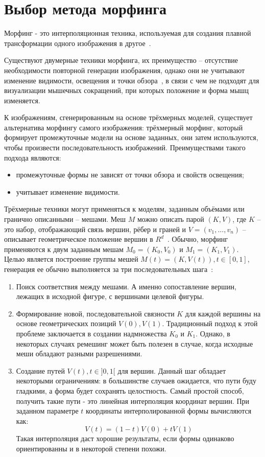 \section{Выбор метода морфинга}
\label{sec:morph}
Морфинг - это интерполяционная техника, используемая для создания плавной трансформации одного изображения в другое~\cite{volume_morph}.
\par Существуют двумерные техники морфинга, их преимущество -- отсутствие необходимости повторной генерации изображения, однако они не учитывают изменение видимости, освещения и точки обзора~\cite{volume_morph}, в связи с чем не подходят для визуализации мышечных сокращений, при которых положение и форма мышц изменяется.
\par К изображениям, сгенерированным на основе трёхмерных моделей, существует альтернатива морфингу самого изображения: трёхмерный морфинг, который формирует промежуточные модели на основе заданных, они затем используются, чтобы произвести последовательность изображений. Преимуществами такого подхода являются:
\begin{itemize}
	\item промежуточные формы не зависят от точки обзора и свойств освещения;
	\item учитывает изменение видимости.
\end{itemize}
Трёхмерные техники могут применяться к моделям, заданным объёмами или гранично описанными -- мешами. Меш $M$ можно описать парой $(K, V)$, где $K$ -- это набор, отображающий связь вершин, рёбер и граней и $V = (v_{1},\dots,v_{n})$ -- описывает геометрическое положение вершин в $R^{d}$~\cite{alexa}. Обычно, морфинг применяются к двум заданным мешам $M_{0}=(K_{0},V_{0})$ и $M_{1}=(K_{1},V_{1})$. Целью является построение группы мешей $M(t)=(K,V(t)),t\in[0,1]$, генерация ее обычно выполняется за три последовательных шага~\cite{alexa}:
\begin{enumerate}[1.]
	\item Поиск соответствия между мешами. А именно сопоставление вершин, лежащих в исходной фигуре, с вершинами целевой фигуры.
	\item Формирование новой, последовательной связности $K$ для каждой вершины на основе геометрических позиций $V(0), V(1)$. Традиционный подход к этой проблеме заключается в создании надмножества $K_{0}$ и $K_{1}$. Однако, в некоторых случаях ремешинг может быть полезен в случае, когда исходные меши обладают разными разрешениями.
	\item Создание путей $V(t),t\in]0,1[$ для вершин. Данный шаг обладает некоторыми ограничениям: в большинстве случаев  ожидается, что пути буду гладкими, а форма будет сохранять целостность. Самый простой способ, получить такие пути - это линейная интерполяция координат вершин. При заданном параметре $t$ координаты интерполированной формы вычисляются как:
	\begin{equation}
	V(t)=(1-t)V(0)+tV(1)
	\end{equation}
	Такая интерполяция даст хорошие результаты, если формы одинаково ориентированны и в некоторой степени похожи.
\end{enumerate}
